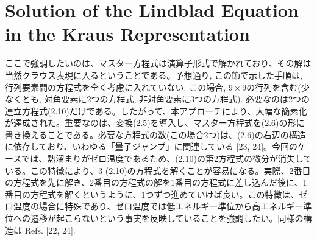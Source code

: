 \section{Solution of the Lindblad Equation in the Kraus Representation}
\cite{nakazato2006solution}
ここで強調したいのは、マスター方程式は演算子形式で解かれており、その解は当然クラウス表現に入るということである。予想通り, この節で示した手順は, 行列要素間の方程式を全く考慮に入れていない. この場合, $9\times9$の行列を含む(少なくとも, 対角要素に2つの方程式, 非対角要素に3つの方程式). 必要なのは2つの連立方程式(2.10)だけである。したがって、本アプローチにより、大幅な簡素化が達成された。重要なのは、変換(2.5)を導入し、マスター方程式を(2.6)の形に書き換えることである。必要な方程式の数(この場合2つ)は、(2.6)の右辺の構造に依存しており、いわゆる「量子ジャンプ」に関連している [23, 24]。今回のケースでは、熱溜まりがゼロ温度であるため、(2.10)の第2方程式の微分が消失している。この特徴により、3 (2.10)の方程式を解くことが容易になる。実際、2番目の方程式を先に解き、2番目の方程式の解を1番目の方程式に差し込んだ後に、1番目の方程式を解くというように、1つずつ進めていけば良い。この特徴は、ゼロ温度の場合に特殊であり、ゼロ温度では低エネルギー準位から高エネルギー準位への遷移が起こらないという事実を反映していることを強調したい。同様の構造は Refs. [22, 24].
